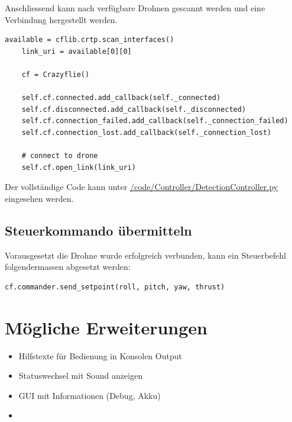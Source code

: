 Anschliessend kann nach verfügbare Drohnen gescannt werden und eine Verbindung hergestellt werden.

\begin{lstlisting}[style=lstStyleCpp]
	available = cflib.crtp.scan_interfaces()
	link_uri = available[0][0]
	
	cf = Crazyflie()
	
	self.cf.connected.add_callback(self._connected)
	self.cf.disconnected.add_callback(self._disconnected)
	self.cf.connection_failed.add_callback(self._connection_failed)
	self.cf.connection_lost.add_callback(self._connection_lost)
	
	# connect to drone
	self.cf.open_link(link_uri)
\end{lstlisting}

Der vollständige Code kann unter \href{https://github.com/MrJack91/droneGestures/blob/master/code/Controller/CrazyflieController.py}{/code/Controller/DetectionController.py} eingesehen werden.

\subsection{Steuerkommando übermitteln}

Vorausgesetzt die Drohne wurde erfolgreich verbunden, kann ein Steuerbefehl folgendermassen abgesetzt werden:

\begin{lstlisting}[style=lstStyleCpp]
	cf.commander.send_setpoint(roll, pitch, yaw, thrust)
\end{lstlisting}


\section{Mögliche Erweiterungen}
\begin{itemize}
	\item Hilfstexte für Bedienung in Konsolen Output
	\item Statuswechsel mit Sound anzeigen
	\item GUI mit Informationen (Debug, Akku)
	\item 
\end{itemize}
